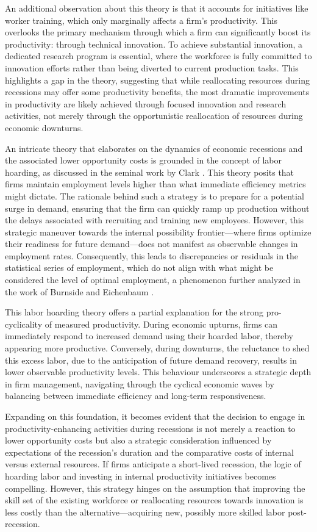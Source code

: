 \documentclass[12pt]{article}
\begin{document}
An additional observation about this theory is that it accounts for initiatives like worker training, which only
marginally affects a firm's productivity. This overlooks the primary mechanism through which a firm can significantly
boost its productivity: through technical innovation. To achieve substantial innovation, a dedicated research program is
essential, where the workforce is fully committed to innovation efforts rather than being diverted to current production
tasks. This highlights a gap in the theory, suggesting that while reallocating resources during recessions may offer
some productivity benefits, the most dramatic improvements in productivity are likely achieved through focused
innovation and research activities, not merely through the opportunistic reallocation of resources during economic
downturns. 

An intricate theory that elaborates on the dynamics of economic recessions and the associated lower opportunity costs is
grounded in the concept of labor hoarding, as discussed in the seminal work by Clark \cite{Cla73}. This theory posits
that firms maintain employment levels higher than what immediate efficiency metrics might dictate. The rationale behind
such a strategy is to prepare for a potential surge in demand, ensuring that the firm can quickly ramp up production
without the delays associated with recruiting and training new employees. However, this strategic maneuver towards the
internal possibility frontier—where firms optimize their readiness for future demand—does not manifest as observable
changes in employment rates. Consequently, this leads to discrepancies or residuals in the statistical series of
employment, which do not align with what might be considered the level of optimal employment, a phenomenon further
analyzed in the work of Burnside and Eichenbaum \cite{BurnCrai93}. 

This labor hoarding theory offers a partial explanation for the strong pro-cyclicality of measured productivity. During
economic upturns, firms can immediately respond to increased demand using their hoarded labor, thereby appearing more
productive. Conversely, during downturns, the reluctance to shed this excess labor, due to the anticipation of future
demand recovery, results in lower observable productivity levels. This behaviour underscores a strategic depth in firm
management, navigating through the cyclical economic waves by balancing between immediate efficiency and long-term
responsiveness. 

Expanding on this foundation, it becomes evident that the decision to engage in productivity-enhancing activities during
recessions is not merely a reaction to lower opportunity costs but also a strategic consideration influenced by
expectations of the recession's duration and the comparative costs of internal versus external resources. If firms
anticipate a short-lived recession, the logic of hoarding labor and investing in internal productivity initiatives
becomes compelling. However, this strategy hinges on the assumption that improving the skill set of the existing
workforce or reallocating resources towards innovation is less costly than the alternative—acquiring new, possibly more
skilled labor post-recession. 
\end{document}

